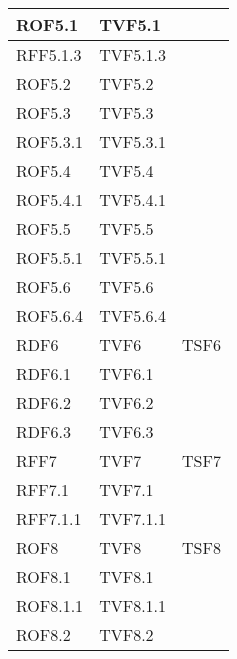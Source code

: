 \begin{center}
\begin{longtable}{| p{4cm} | p{4cm} | p{4cm} |}
	\hline
	\hspace{2 mm} ROF5.1  & TVF5.1 &  \\
	\hline
	\hspace{4 mm} RFF5.1.3  & TVF5.1.3 &  \\
	\hline
	\hspace{2 mm} ROF5.2  & TVF5.2 &  \\
	\hline
	\hspace{2 mm} ROF5.3  & TVF5.3 &  \\
	\hline
	\hspace{4 mm} ROF5.3.1  & TVF5.3.1 &  \\
	\hline
	\hspace{2 mm} ROF5.4  & TVF5.4 &  \\
	\hline
	\hspace{4 mm} ROF5.4.1  & TVF5.4.1 &  \\
	\hline
	\hspace{2 mm} ROF5.5  & TVF5.5 &  \\
	\hline
	\hspace{4 mm} ROF5.5.1  & TVF5.5.1 &  \\
	\hline
	\hspace{2 mm} ROF5.6  & TVF5.6 &  \\
	\hline
	\hspace{4 mm} ROF5.6.4  & TVF5.6.4 &  \\
	\hline
	RDF6  & TVF6 & TSF6 \\
	\hline
	\hspace{2 mm} RDF6.1  & TVF6.1 &  \\
	\hline
	\hspace{2 mm} RDF6.2  & TVF6.2 &  \\
	\hline
	\hspace{2 mm} RDF6.3  & TVF6.3 &  \\
	\hline
	RFF7  & TVF7 & TSF7 \\
	\hline
	\hspace{2 mm} RFF7.1  & TVF7.1 &  \\
	\hline
	\hspace{4 mm} RFF7.1.1  & TVF7.1.1 &  \\
	\hline
	ROF8  & TVF8 & TSF8 \\
	\hline
	\hspace{2 mm} ROF8.1  & TVF8.1 &  \\
	\hline
	\hspace{4 mm} ROF8.1.1  & TVF8.1.1 &  \\
	\hline
	\hspace{2 mm} ROF8.2  & TVF8.2 &  \\

\end{longtable}
\end{center}
